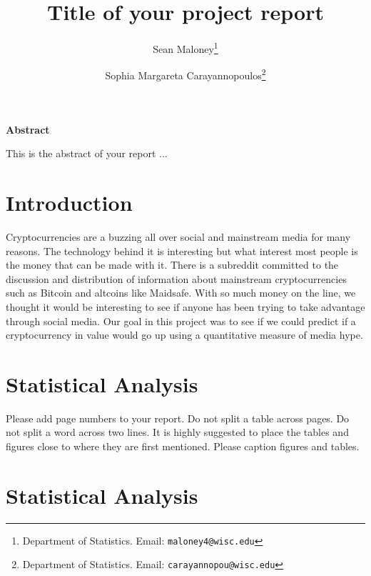 \documentclass[12pt]{article}
\begin{document}
\title{Title of your project report}  

\author{
Sean Maloney\thanks{Department of Statistics.  Email: {\tt maloney4@wisc.edu}}  %
\and 
Sophia Margareta Carayannopoulos\thanks{Department of Statistics.  Email: {\tt  carayannopou@wisc.edu}}  %
}

\maketitle

\begin{center}
\textbf{Abstract}
\end{center}

This is the abstract of your report ... 



\thispagestyle{empty}

\newpage


\section{Introduction}\label{intro}

Cryptocurrencies are a buzzing all over social and mainstream media for many reasons. The technology behind it is interesting but what interest most people is the money that can be made with it. There is a subreddit committed to the discussion and distribution of information about mainstream cryptocurrencies such as Bitcoin and altcoins like Maidsafe. With so much money on the line, we thought it would be interesting to see if anyone has been trying to take advantage through social media. Our goal in this project was to see if we could predict if a cryptocurrency in value would go up using a quantitative measure of media hype.


\section{Statistical Analysis}\label{datagather}

Please add page numbers to your report. Do not split a table across pages. Do not split a word across two lines. It is highly suggested to place the tables and figures close to where they are first mentioned. Please caption figures and tables.


\section{Statistical Analysis}
\end{document}

